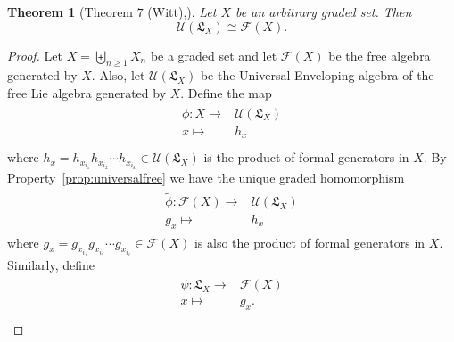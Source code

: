 \documentclass[11pt]{amsart}
\newtheorem{thm}{Theorem}
\theoremstyle{definition}
\numberwithin{equation}{section}
\begin{document}
\begin{thm}[Theorem $7$ (Witt),\cite{jacobson2013lie}]
Let $X$ be an arbitrary graded set.  Then
\[
\mathcal{U}(\mathfrak{L}_{X}) \cong \mathcal{F}(X).
\]
\label{thm: free UEA}
%
%
%
\end{thm}
\begin{proof}
    Let \(X = \biguplus_{n \ge 1} X_{n}\) be a graded set and let \(\mathcal{F}(X)\) be the free algebra generated by \(X\). Also, let \( \mathcal{U} (\mathfrak{L}_{X})\) be the Universal Enveloping algebra of the free Lie algebra generated by \(X\). 
    Define the map 
    \begin{align*}
        \begin{array}{rcl}
            \phi :  X \longrightarrow & \mathcal{U} (\mathfrak{L}_{X}) \\
             x  \longmapsto  & h_x \\ 
        \end{array}
    \end{align*}
    where \(h_x =  h_{x_{i_{1}} }h_{x_{i_{2}} }\cdots h_{x_{i_{k}} } \in \mathcal{U} (\mathfrak{L}_{X})\) is the product of formal generators in \(X\). 
    By Property~\ref{prop:universalfree} we have the unique graded homomorphism 
    \begin{align*}
        \begin{array}{rcl}
            \tilde{\phi}: \mathcal{F}(X) \longrightarrow & \mathcal{U} (\mathfrak{L}_{X}) \\
            g_x \longmapsto & h_x
        \end{array}
    \end{align*}
    where \(g_x = g_{x_{i_{1}} }g_{x_{i_{2}} }\cdots g_{x_{i_{\ell}} } \in \mathcal{F}(X)\) is also the product of formal generators in \(X\). Similarly, 
    define 
    \begin{align*}
        \begin{array}{rcl}
            \psi :  \mathfrak{L}_{X} \longrightarrow &\mathcal{F}(X) \\
        x  \longmapsto  & g_x .\\
        \end{array}
    \end{align*}

\end{proof}
\end{document}
